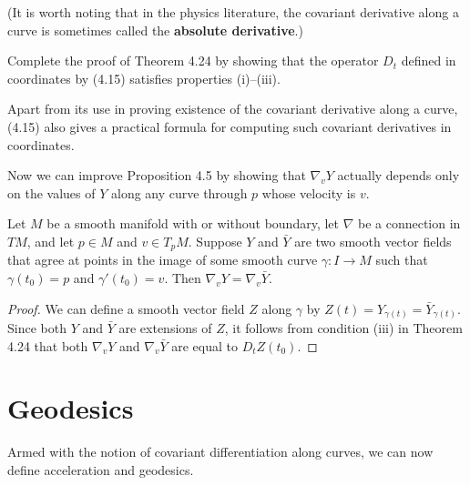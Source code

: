 (It is worth noting that in the physics literature, the covariant derivative along a curve is sometimes called the \textbf{absolute derivative}.)

\begin{exercise}
\label{exer:covariant-derivative-properties}
Complete the proof of Theorem 4.24 by showing that the operator $D_t$ defined in coordinates by (4.15) satisfies properties (i)--(iii).
\end{exercise}

Apart from its use in proving existence of the covariant derivative along a curve, (4.15) also gives a practical formula for computing such covariant derivatives in coordinates.

Now we can improve Proposition 4.5 by showing that $\nabla_v Y$ actually depends only on the values of $Y$ along any curve through $p$ whose velocity is $v$.

\begin{proposition}
\label{prop:covariant-derivative-depends-on-curve}
Let $M$ be a smooth manifold with or without boundary, let $\nabla$ be a connection in $TM$, and let $p \in M$ and $v \in T_p M$. Suppose $Y$ and $\bar{Y}$ are two smooth vector fields that agree at points in the image of some smooth curve $\gamma: I \to M$ such that $\gamma(t_0) = p$ and $\gamma'(t_0) = v$. Then $\nabla_v Y = \nabla_v \bar{Y}$.
\end{proposition}

\begin{proof}
We can define a smooth vector field $Z$ along $\gamma$ by $Z(t) = Y_{\gamma(t)} = \bar{Y}_{\gamma(t)}$. Since both $Y$ and $\bar{Y}$ are extensions of $Z$, it follows from condition (iii) in Theorem 4.24 that both $\nabla_v Y$ and $\nabla_v \bar{Y}$ are equal to $D_t Z(t_0)$.
\end{proof}

\section{Geodesics}

Armed with the notion of covariant differentiation along curves, we can now define acceleration and geodesics.

